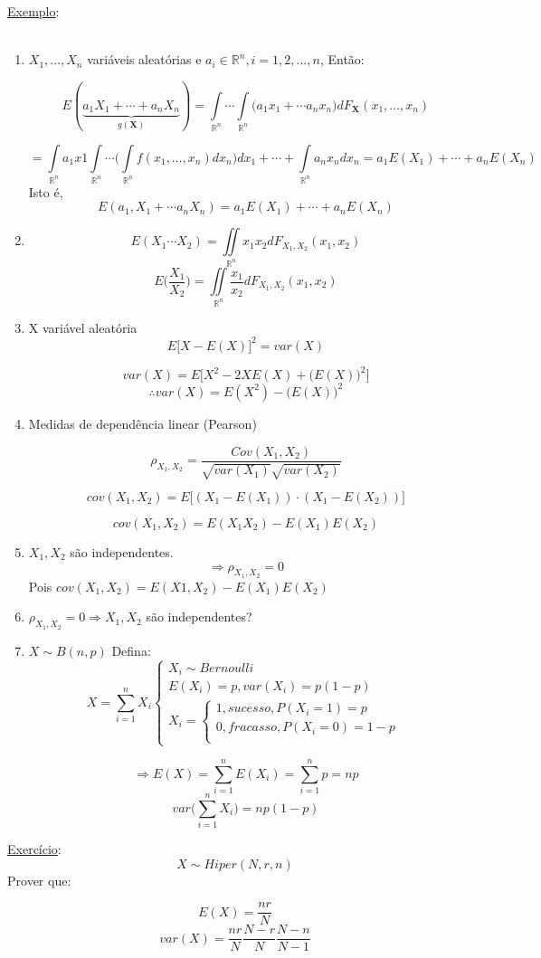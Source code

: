 \documentclass[a4paper,12pt]{article}
\begin{document}
\underline{Exemplo}:\\
\\
\begin{enumerate}[label=\arabic*)]
	\item $X_1,\ldots,X_n$ variáveis aleatórias e $a_i \in \mathbb R^n, i=1,2,\ldots,n$, Então:
	
	$$E(\underbrace{a_1X_1+\cdots + a_nX_n}_{g(\bm X)}) =
	\int\limits_{\mathbb R^n} \cdots	\int\limits_{\mathbb R^n} \bigg(a_1x_1+\cdots a_nx_n\bigg) dF_{\bm X}(x_1,\ldots,x_n)
	$$
	
	
	$$
	= \int\limits_{\mathbb R^n} a_1x1	\int\limits_{\mathbb R^n} \cdots	\bigg(\int\limits_{\mathbb R^n} 
	f(x_1,\ldots,x_n) dx_n \bigg)dx_1
	+\cdots + 
	\int\limits_{\mathbb R^n} a_n x_n dx_n = a_1 E(X_1)+\cdots +a_n E(X_n)
	$$
	Isto é,
	$$E(a_1,X_1+\cdots a_nX_n) =  a_1 E(X_1)+\cdots +a_n E(X_n) $$
	\item $$E(X_1\cdots X_2) = \iint\limits_{\mathbb R^n} x_1 x_2 dF_{X_1,X_2}(x_1,x_2)$$
$$E\bigg(\frac{X_1}{X_2}\bigg) = \iint\limits_{\mathbb R^n} \frac{x_1}{x_2} dF_{X_1,X_2}(x_1,x_2)$$

\item X variável aleatória 
$$E\bigg[
X - E(X)
\bigg]^2 = var(X) $$

$$var(X) =  E\bigg[
X^2 -2XE(X) + \bigg(E(X)\bigg)^2
\bigg]$$
$$\therefore var(X) = E(X^2)-\bigg(E(X)\bigg)^2 $$

\item Medidas de dependência linear (Pearson)

$$\rho_{X_1,X_2} = \frac{Cov(X_1,X_2)}{\sqrt{var(X_1)}\sqrt{var(X_2)}} $$

$$cov(X_1,X_2)= 
E\bigg[
(X_1-E(X_1))\cdot(X_1-E(X_2))
\bigg]
 $$
 
 $$cov(X_1,X_2) = E(X_1X_2) - E(X_1)E(X_2) $$
 
 \item $X_1, X_2$ são independentes.
 $$\Rightarrow \rho_{X_1,X_2} = 0 $$  
 Pois $cov(X_1,X_2) = E(X1,X_2) -E(X_1)E(X_2) $
 
 \item $\rho_{X_1,X_2} = 0 \Rightarrow X_1, X_2$ são independentes?
 \item $X\sim B(n,p)$ 
 Defina:
  $$X = \sum\limits_{i=1}^{n} X_i  \begin{cases}
  X_i\sim Bernoulli\\
  E(X_i)=p, var(X_i)=p(1-p)\\
  X_i = \begin{cases}
  1,sucesso,P(X_i=1)=p\\
  0,fracasso, P(X_i=0)=1-p\\
  \end{cases}
  \end{cases}
  $$
  
  $$ 
  \Rightarrow E(X) = \sum\limits_{i=1}^{n} E(X_i)=\sum\limits_{i=1}^{n}p=np
  $$
  $$var\bigg(
  \sum\limits_{i=1}^{n} X_i
  \bigg)
  =np(1-p)
   $$
\end{enumerate}
\underline{Exercício}:
$$X\sim Hiper(N,r,n) $$
Prover que:

$$E(X)=\frac{nr}{N} $$
$$var(X) = \frac{nr}{N} \frac{N-r}{N}  \frac{N-n}{N-1}$$
\end{document}

